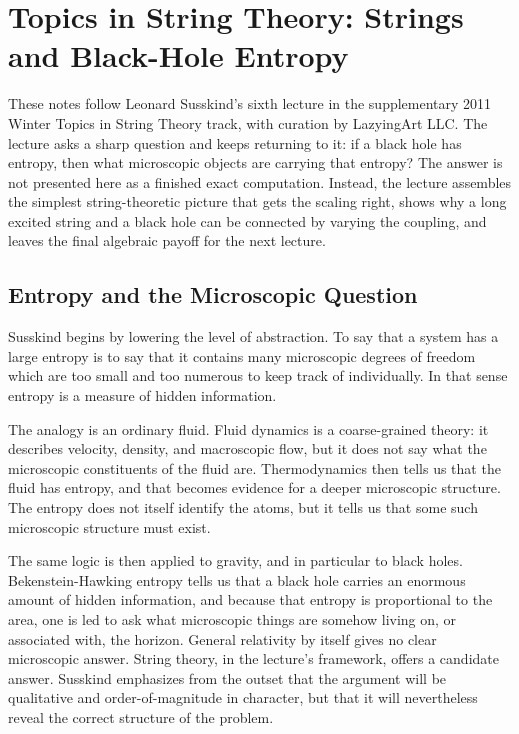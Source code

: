 \chapter{Topics in String Theory: Strings and Black-Hole Entropy}

These notes follow Leonard Susskind's sixth lecture in the supplementary 2011 Winter Topics in String Theory track, with curation by LazyingArt LLC. The lecture asks a sharp question and keeps returning to it: if a black hole has entropy, then what microscopic objects are carrying that entropy? The answer is not presented here as a finished exact computation. Instead, the lecture assembles the simplest string-theoretic picture that gets the scaling right, shows why a long excited string and a black hole can be connected by varying the coupling, and leaves the final algebraic payoff for the next lecture.

\section{Entropy and the Microscopic Question}

Susskind begins by lowering the level of abstraction. To say that a system has a large entropy is to say that it contains many microscopic degrees of freedom which are too small and too numerous to keep track of individually. In that sense entropy is a measure of hidden information.

The analogy is an ordinary fluid. Fluid dynamics is a coarse-grained theory: it describes velocity, density, and macroscopic flow, but it does not say what the microscopic constituents of the fluid are. Thermodynamics then tells us that the fluid has entropy, and that becomes evidence for a deeper microscopic structure. The entropy does not itself identify the atoms, but it tells us that some such microscopic structure must exist.

The same logic is then applied to gravity, and in particular to black holes. Bekenstein-Hawking entropy tells us that a black hole carries an enormous amount of hidden information, and because that entropy is proportional to the area, one is led to ask what microscopic things are somehow living on, or associated with, the horizon. General relativity by itself gives no clear microscopic answer. String theory, in the lecture's framework, offers a candidate answer. Susskind emphasizes from the outset that the argument will be qualitative and order-of-magnitude in character, but that it will nevertheless reveal the correct structure of the problem.


